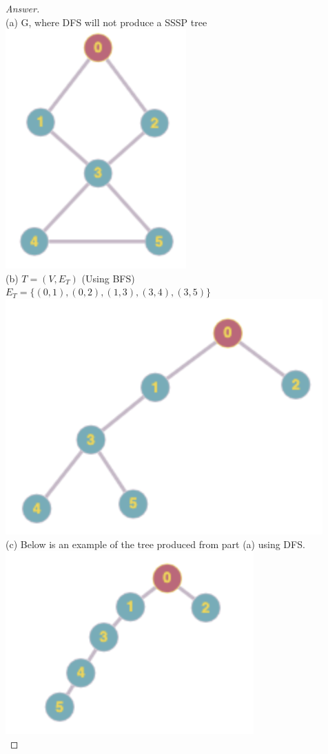 \documentclass[11pt]{article}
\theoremstyle{definition}
\theoremstyle{definition}
\theoremstyle{definition}
\begin{document}
\noindent 
\begin{proof}[Answer] $ $ \\
(a) G, where DFS will not produce a SSSP tree \\
\includegraphics[]{image1.png} \\
(b) $T = (V, E_T)$ (Using BFS) \\
 $E_T = \{(0,1), (0,2), (1,3), (3,4), (3,5)\}$ \\
\includegraphics[]{image2.png} \\
(c) Below is an example of the tree produced from part (a) using DFS.\\ 
\includegraphics[]{image3.png} \\

\end{proof}
\end{document}

